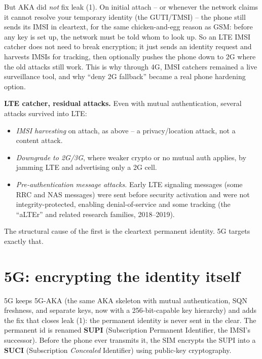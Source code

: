 But AKA did \emph{not} fix leak (1). On initial attach -- or whenever the network claims it cannot resolve your temporary identity (the GUTI/TMSI) -- the phone still sends its IMSI in cleartext, for the same chicken-and-egg reason as GSM: before any key is set up, the network must be told whom to look up. So an LTE IMSI catcher does not need to break encryption; it just sends an identity request and harvests IMSIs for tracking, then optionally pushes the phone down to 2G where the old attacks still work. This is why through 4G, IMSI catchers remained a live surveillance tool, and why ``deny 2G fallback'' became a real phone hardening option.

\begin{attackbox}
\textbf{LTE catcher, residual attacks.} Even with mutual authentication, several attacks survived into LTE:
\begin{itemize}
  \item \emph{IMSI harvesting} on attach, as above -- a privacy/location attack, not a content attack.
  \item \emph{Downgrade to 2G/3G}, where weaker crypto or no mutual auth applies, by jamming LTE and advertising only a 2G cell.
  \item \emph{Pre-authentication message attacks.} Early LTE signaling messages (some RRC and NAS messages) were sent before security activation and were not integrity-protected, enabling denial-of-service and some tracking (the ``aLTEr'' and related research families, 2018--2019).
\end{itemize}
The structural cause of the first is the cleartext permanent identity. 5G targets exactly that.
\end{attackbox}

\section{5G: encrypting the identity itself}
\label{ch29:5g}

5G keeps 5G-AKA (the same AKA skeleton with mutual authentication, SQN freshness, and separate keys, now with a 256-bit-capable key hierarchy) and adds the fix that closes leak (1): the permanent identity is never sent in the clear. The permanent id is renamed \textbf{SUPI} (Subscription Permanent Identifier, the IMSI's successor). Before the phone ever transmits it, the SIM encrypts the SUPI into a \textbf{SUCI} (Subscription \emph{Concealed} Identifier) using public-key cryptography.

